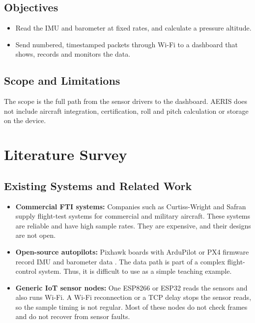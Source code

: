 \documentclass[12pt,a4paper]{report}
\begin{document}
\section{Objectives}
\begin{itemize}
\item Read the IMU and barometer at fixed rates, and calculate a pressure altitude.
\item Send numbered, timestamped packets through Wi-Fi to a dashboard that shows, records and monitors the data.
\end{itemize}

\section{Scope and Limitations}
The scope is the full path from the sensor drivers to the dashboard. AERIS does not include aircraft integration, certification, roll and pitch calculation or storage on the device.

\chapter{Literature Survey}
\section{Existing Systems and Related Work}
\begin{itemize}
\item \textbf{Commercial FTI systems:} Companies such as Curtiss-Wright and Safran supply flight-test systems for commercial and military aircraft. These systems are reliable and have high sample rates. They are expensive, and their designs are not open.
\item \textbf{Open-source autopilots:} Pixhawk boards with ArduPilot or PX4 firmware record IMU and barometer data \cite{ardupilot}. The data path is part of a complex flight-control system. Thus, it is difficult to use as a simple teaching example.
\item \textbf{Generic IoT sensor nodes:} One ESP8266 or ESP32 reads the sensors and also runs Wi-Fi. A Wi-Fi reconnection or a TCP delay stops the sensor reads, so the sample timing is not regular. Most of these nodes do not check frames and do not recover from sensor faults.
\end{itemize}
\end{document}

